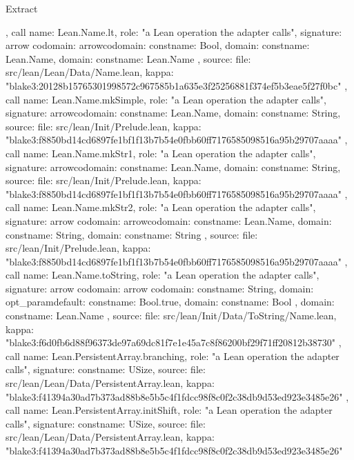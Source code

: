 \begin{lexlean}{Extract}
\begin{toolingmodule}
{{    },
    call{
      name: Lean.Name.lt,
      role: "a Lean operation the adapter calls",
      signature: arrow{
        codomain: arrow{codomain: const{name: Bool}, domain: const{name: Lean.Name}},
        domain: const{name: Lean.Name}
      },
      source: {
        file: src/lean/Lean/Data/Name.lean,
        kappa: "blake3:20128b15765301998572c967585b1a635e3f25256881f374ef5b3eae5f27f0bc"
      }
    },
    call{
      name: Lean.Name.mkSimple,
      role: "a Lean operation the adapter calls",
      signature: arrow{codomain: const{name: Lean.Name}, domain: const{name: String}},
      source: {
        file: src/lean/Init/Prelude.lean,
        kappa: "blake3:f8850bd14cd6897fe1bf1f13b7b54e0fbb60ff7176585098516a95b29707aaaa"
      }
    },
    call{
      name: Lean.Name.mkStr1,
      role: "a Lean operation the adapter calls",
      signature: arrow{codomain: const{name: Lean.Name}, domain: const{name: String}},
      source: {
        file: src/lean/Init/Prelude.lean,
        kappa: "blake3:f8850bd14cd6897fe1bf1f13b7b54e0fbb60ff7176585098516a95b29707aaaa"
      }
    },
    call{
      name: Lean.Name.mkStr2,
      role: "a Lean operation the adapter calls",
      signature: arrow{
        codomain: arrow{codomain: const{name: Lean.Name}, domain: const{name: String}},
        domain: const{name: String}
      },
      source: {
        file: src/lean/Init/Prelude.lean,
        kappa: "blake3:f8850bd14cd6897fe1bf1f13b7b54e0fbb60ff7176585098516a95b29707aaaa"
      }
    },
    call{
      name: Lean.Name.toString,
      role: "a Lean operation the adapter calls",
      signature: arrow{
        codomain: arrow{
          codomain: const{name: String},
          domain: opt_param{default: const{name: Bool.true}, domain: const{name: Bool}}
        },
        domain: const{name: Lean.Name}
      },
      source: {
        file: src/lean/Init/Data/ToString/Name.lean,
        kappa: "blake3:f6d0fb6d88f96373de97a69dc81f7e1e45a7c8f86200bf29f71ff20812b38730"
      }
    },
    call{
      name: Lean.PersistentArray.branching,
      role: "a Lean operation the adapter calls",
      signature: const{name: USize},
      source: {
        file: src/lean/Lean/Data/PersistentArray.lean,
        kappa: "blake3:f41394a30ad7b373ad88b8e5b5c4f1fdcc98f8c0f2c38db9d53ed923e3485e26"
      }
    },
    call{
      name: Lean.PersistentArray.initShift,
      role: "a Lean operation the adapter calls",
      signature: const{name: USize},
      source: {
        file: src/lean/Lean/Data/PersistentArray.lean,
        kappa: "blake3:f41394a30ad7b373ad88b8e5b5c4f1fdcc98f8c0f2c38db9d53ed923e3485e26"
}}}
\end{toolingmodule}
\end{lexlean}
